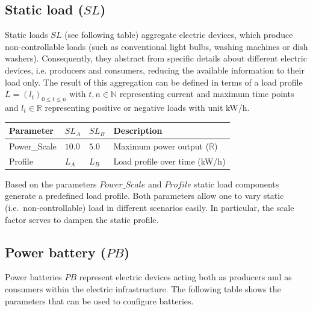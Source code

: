 \subsection{Static load ($SL$)}

Static loads $SL$ (see following table) aggregate electric devices, which produce non-controllable loads (such as conventional light bulbs, washing machines or dish washers). Consequently, they abstract from specific details about different electric devices, i.e. producers and consumers, reducing the available information to their load only. The result of this aggregation can be defined in terms of a load profile $L = (l_t)_{0 \leq t \leq n}$ with $t,n \in \mathbb{N}$ representing current and maximum time points and $l_t \in \mathbb{R}$ representing positive or negative loads with unit kW/h.

\begin{table}[h]
	\renewcommand{\arraystretch}{1.3}
	\centering
	\begin{tabularx}{\columnwidth}{lllX}
		\hline
		\textbf{Parameter}              & \textbf{$SL_{A}$}  & \textbf{$SL_{B}$}   & \textbf{Description} \\ \hline
		Power\_Scale                   	  & $10.0$ & $5.0$ & Maximum power output ($\mathbb{R}$) \\
		Profile                       	  	   & $L_A$ & $L_B$ & Load profile over time  (kW/h)\\ \hline
	\end{tabularx}
\end{table}

Based on the parameters $Power\_Scale$ and $Profile$ static load components generate a predefined load profile. Both parameters allow one to vary static (i.e.\ non-controllable) load in different scenarios easily. In particular, the scale factor serves to dampen the static profile.

\subsection{Power battery ($PB$)}

Power batteries $PB$ represent electric devices acting both as producers and as consumers within the electric infrastructure. The following table shows the parameters that can be used to configure batteries.

